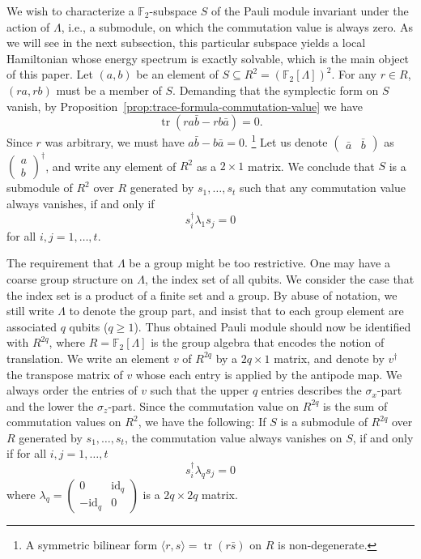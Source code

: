 \documentclass[letterpaper,12pt]{amsart}
\theoremstyle{definition} \newtheorem{defn}{Definition}
\theoremstyle{definition} \newtheorem{rem}{Remark}
\theoremstyle{definition} \newtheorem{example}{Example}
\newcommand{\tr}{\mathop{\mathrm{tr}}}
\newcommand{\FF}{\mathbb{F}}
\newcommand{\id}{\mathrm{id}}
\begin{document}
We wish to characterize a $\FF_2$-subspace $S$ of the Pauli module
invariant under the action of $\Lambda$, i.e., a submodule,
on which the commutation value is always zero.
As we will see in the next subsection,
this particular subspace yields a local Hamiltonian whose energy spectrum is exactly solvable,
which is the main object of this paper.
%
Let $(a,b)$ be an element of $S \subseteq R^2 = (\FF_2[\Lambda])^2$.
For any $r \in R$, $(ra, rb)$ must be a member of $S$.
Demanding that the symplectic form on $S$ vanish,
by Proposition~\ref{prop:trace-formula-commutation-value} we have
\[
 \tr (ra \bar b - rb \bar a) = 0 .
\]
Since $r$ was arbitrary, we must have $a \bar b - b \bar a = 0$.%
%
\footnote{{A symmetric bilinear form $ \langle r, s \rangle = \tr(r \bar{s}) $ on $R$ is non-degenerate.}}
%
Let us denote $\begin{pmatrix}\bar a & \bar b \end{pmatrix}$ 
as $\begin{pmatrix} a \\ b \end{pmatrix}^\dagger$,
and write any element of $R^2$ as a $2 \times 1$ matrix.
We conclude that $S$ is a submodule of $R^2$ over $R$ generated by $s_1, \ldots, s_t$
such that any commutation value always vanishes, if and only if
\[
 s_i^\dagger \lambda_1 s_j = 0
\]
for all $i,j = 1,\ldots,t$.

The requirement that $\Lambda$ be a group might be too restrictive.
One may have a coarse group structure on $\Lambda$, the index set of all qubits.
We consider the case that the index set is a product of a finite set and a group.
By abuse of notation, we still write $\Lambda$ to denote the group part,
and insist that to each group element are associated $q$ qubits ($q \ge 1$).
Thus obtained Pauli module should now be identified with $R^{2q}$,
where $R = \FF_2[\Lambda]$ is the group algebra
that encodes the notion of translation.
We write an element $v$ of $R^{2q}$ by a $2q \times 1$ matrix,
and denote by $v^\dagger$ the transpose matrix of $v$ whose each entry is applied by the antipode map.
We always order the entries of $v$ such that the upper $q$ entries
describes the $\sigma_x$-part and the lower the $\sigma_z$-part.
Since the commutation value on $R^{2q}$ is the sum of commutation values on $R^2$,
we have the following:
If $S$ is a submodule of $R^{2q}$ over $R$ generated by $s_1, \ldots, s_t$,
the commutation value always vanishes on $S$, if and only if for all $i,j = 1, \ldots, t$
\[
 s_i^\dagger \lambda_q s_j = 0
\]
where $\lambda_q = \begin{pmatrix} 0 & \id_q \\ -\id_q & 0 \end{pmatrix}$ is a $2q \times 2q$ matrix.
\end{document}
